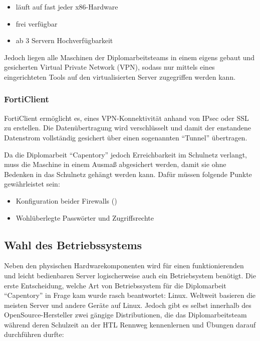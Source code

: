 \begin{itemize}
\tightlist
\item
  läuft auf fast jeder x86-Hardware
\item
  frei verfügbar
\item
  ab 3 Servern Hochverfügbarkeit
\end{itemize}

Jedoch liegen alle Maschinen der Diplomarbeitsteams in einem eigens
gebaut und gesicherten Virtual Private Network (VPN), sodass nur mittels
eines eingerichteten Tools auf den virtualisierten Server zugegriffen
werden kann.

\hypertarget{forticlient}{%
\subsubsection{FortiClient}\label{forticlient}}

FortiClient ermöglicht es, eines VPN-Konnektivität anhand von IPsec oder
SSL zu erstellen. Die Datenübertragung wird verschlüsselt und damit der
enstandene Datenstrom vollständig gesichert über einen sogenannten
``Tunnel'' übertragen.

Da die Diplomarbeit ``Capentory'' jedoch Erreichbarkeit im Schulnetz
verlangt, muss die Maschine in einem Ausmaß abgesichert werden, damit
sie ohne Bedenken in das Schulnetz gehängt werden kann. Dafür müssen
folgende Punkte gewährleistet sein:

\begin{itemize}
\tightlist
\item
  Konfiguration beider Firewalls
  ()
\item
  Wohlüberlegte Passwörter und Zugriffsrechte
\end{itemize}

\hypertarget{wahl-des-betriebssystems}{%
\subsection{Wahl des Betriebssystems}\label{wahl-des-betriebssystems}}

Neben den physischen Hardwarekomponenten wird für einen funktionierenden
und leicht bedienbaren Server logischerweise auch ein Betriebsystem
benötigt. Die erste Entscheidung, welche Art von Betriebssystem für die
Diplomarbeit ``Capentory'' in Frage kam wurde rasch beantwortet: Linux.
Weltweit basieren die meisten Server und andere Geräte auf Linux. Jedoch
gibt es selbst innerhalb des OpenSource-Hersteller zwei gängige
Distributionen, die das Diplomarbeitsteam während deren Schulzeit an der
HTL Rennweg kennenlernen und Übungen darauf durchführen durfte:

